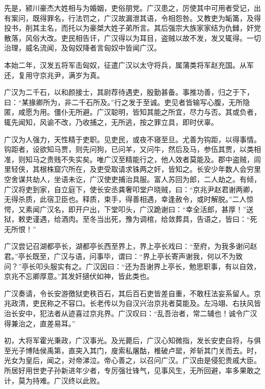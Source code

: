 \documentclass[]{article}
\begin{document}
先是，颍川豪杰大姓相与为婚姻，吏俗朋党。广汉患之，厉使其中可用者受记，出有案问，既得罪名，行法罚之，广汉故漏泄其语，令相怨咎。又教吏为缿筩，及得投书，削其主名，而托以为豪桀大姓子弟所言。其后强宗大族家家结为仇雠，奸党散落，风俗大改。吏民相告讦，广汉得以为耳目，盗贼以故不发，发又辄得。一切治理，威名流闻，及匈奴降者言匈奴中皆闻广汉。

本始二年，汉发五将军击匈奴，征遣广汉以太守将兵，属蒲类将军赵充国。从军还，复用守京兆尹，满岁为真。

广汉为二千石，以和颜接士，其尉荐待遇吏，殷勤甚备。事推功善，归之于下，曰：``某掾卿所为，非二千石所及。''行之发于至诚。吏见者皆输写心腹，无所隐匿，咸愿为用。僵仆无所避。广汉聪明，皆知其能之所宜，尽力与否。其或负者，辄先闻知，风谕不改，乃收捕之，无所逃，按之罪立具，即时伏辜。

广汉为人强力，天性精于吏职。见吏民，或夜不寝至旦。尤善为钩距，以得事情。钩距者，设欲知马贾，则先问狗，已问羊，又问牛，然后及马，参伍其贾，以类相准，则知马之贵贱不失实矣。唯广汉至精能行之，他人效者莫能及。郡中盗贼，闾里轻侠，其根株窟穴所在，及吏受取请求铢两之奸，皆知之。长安少年数人会穷里空舍谋共劫人，坐语未讫，广汉使吏捕治具服。富人苏回为郎，二人劫之。有倾，广汉将吏到家，自立庭下，使长安丞龚奢叩堂户晓贼，曰：``京兆尹赵君谢两卿，无得杀质，此宿卫臣也。释质，束手，得善相遇，幸逢赦令，或时解脱。''二人惊愕，又素闻广汉名，即开户出，下堂叩头，广汉跪谢曰：``幸全活郎，甚厚！''送狱，敕吏谨遇，给酒肉。至冬当出死，豫为调棺，给敛葬具，告语之，皆曰：``死无所恨！''

广汉尝记召湖都亭长，湖都亭长西至界上，界上亭长戏曰：``至府，为我多谢问赵君。''亭长既至，广汉与语，问事毕，谓曰：``界上亭长寄声谢我，何以不为致问？''亭长叩头服实有之。广汉因曰：``还为吾谢界上亭长，勉思职事，有以自效，京兆不忘卿厚意。''其发奸擿伏如神，皆此类也。

广汉奏请，令长安游徼狱吏秩百石，其后百石吏皆差自重，不敢枉法妄系留人。京兆政清，吏民称之不容口。长老传以为自汉兴治京兆者莫能及。左冯翊、右扶风皆治长安中，犯法者从迹喜过京兆界。广汉叹曰：``乱吾治者，常二辅也！诚令广汉得兼治之，直差易耳。''

初，大将军霍光秉政，广汉事光。及光薨后，广汉心知微指，发长安吏自将，与俱至光子博陆侯禹第，直突入其门，廋索私屠酤，椎破卢罂，斧斩其门关而去。时，光女为皇后，闻之，对帝涕泣。帝心善之，以召问广汉。广汉由是侵犯贵戚大臣。所居好用世吏子孙新进年少者，专厉强壮锋气，见事风生，无所回避，率多果敢之计，莫为持难。广汉终以此败。
\end{document}
